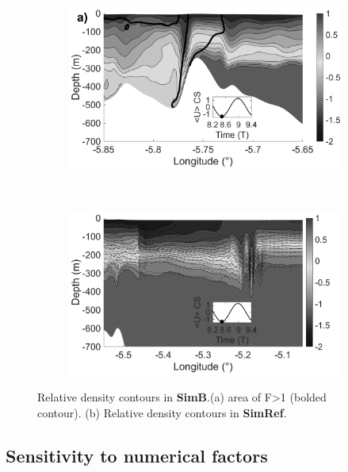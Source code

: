 \color{black}
\begin{figure}[!h]
  \centering
  \begin{subfigure}{0.45\linewidth}
  \includegraphics[width=1\textwidth]{./papier2D/RW_j4_9h12_spring.png}
  \end{subfigure}
  ~
    \centering
  \begin{subfigure}{0.45\linewidth}
  \includegraphics[width=1\textwidth]{./papier2D/CV_train_spring.png}
  \end{subfigure}
  \caption{Relative density contours in \textbf{SimB}.(a) area of F>1 (bolded contour). (b) Relative density contours in \textbf{SimRef}.}
  \label{fig_cv_spring}
\end{figure}


\subsection{Sensitivity to numerical factors}

